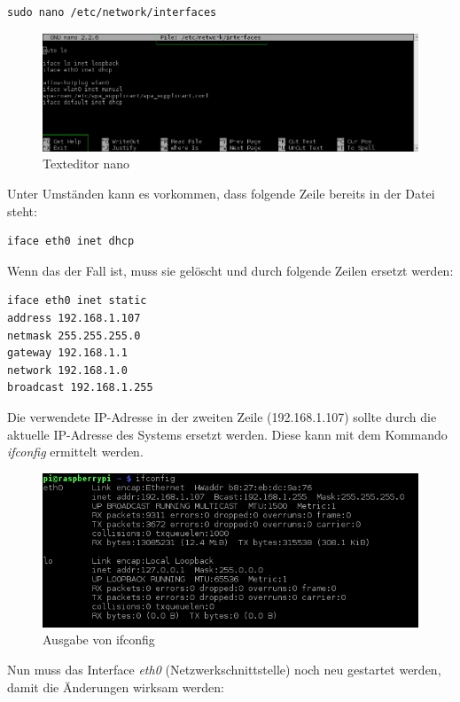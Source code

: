 \begin{lstlisting}
sudo nano /etc/network/interfaces
\end{lstlisting} 

\begin{figure}[h]
\centering
\includegraphics[scale=0.6]{images/nano}
\caption{Texteditor nano}
\end{figure}

Unter Umständen kann es vorkommen, dass folgende Zeile bereits in der Datei steht:

\begin{lstlisting}
iface eth0 inet dhcp
\end{lstlisting}

Wenn das der Fall ist, muss sie gelöscht und durch folgende Zeilen ersetzt werden:

\begin{lstlisting}
iface eth0 inet static
address 192.168.1.107
netmask 255.255.255.0
gateway 192.168.1.1
network 192.168.1.0
broadcast 192.168.1.255
\end{lstlisting}

Die verwendete IP-Adresse in der zweiten Zeile (192.168.1.107) sollte durch die aktuelle IP-Adresse des Systems ersetzt werden. Diese kann mit dem Kommando \textit{ifconfig} ermittelt werden.

\begin{figure}[h]
\centering
\includegraphics[scale=0.65]{images/ifconfig}
\caption{Ausgabe von ifconfig}
\end{figure}

Nun muss das Interface \textit{eth0} (Netzwerkschnittstelle) noch neu gestartet werden, damit die Änderungen wirksam werden:

